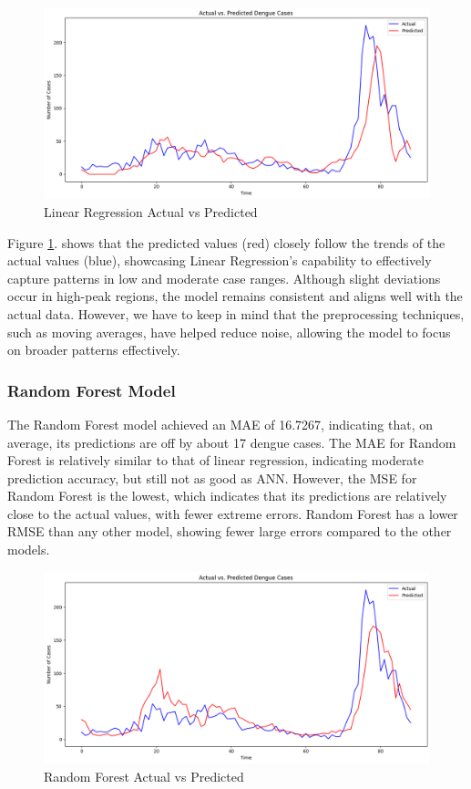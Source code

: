 \documentclass{article}
\begin{document}
\begin{figure}[h!]
    \centering
    \includegraphics[width=1\linewidth]{image/Linear Regression plot.png}
    \caption{Linear Regression Actual vs Predicted}
    \label{fig:lr}
\end{figure}

Figure \ref{fig:lr}. shows that the predicted values (red) closely follow the trends of the actual values (blue), showcasing Linear Regression's capability to effectively capture patterns in low and moderate case ranges. Although slight deviations occur in high-peak regions, the model remains consistent and aligns well with the actual data. However, we have to keep in mind that the preprocessing techniques, such as moving averages, have helped reduce noise, allowing the model to focus on broader patterns effectively.

\subsubsection{Random Forest Model}
The Random Forest model achieved an MAE of 16.7267, indicating that, on average, its predictions are off by about 17 dengue cases. The MAE for Random Forest is relatively similar to that of linear regression, indicating moderate prediction accuracy, but still not as good as ANN. However, the MSE for Random Forest is the lowest, which indicates that its predictions are relatively close to the actual values, with fewer extreme errors. Random Forest has a lower RMSE than any other model, showing fewer large errors compared to the other models.


\begin{figure}[h!]
    \centering
    \includegraphics[width=1\linewidth]{image/Random Forest plot.png}
    \caption{Random Forest Actual vs Predicted}
    \label{fig:rf}
\end{figure}
\end{document}
